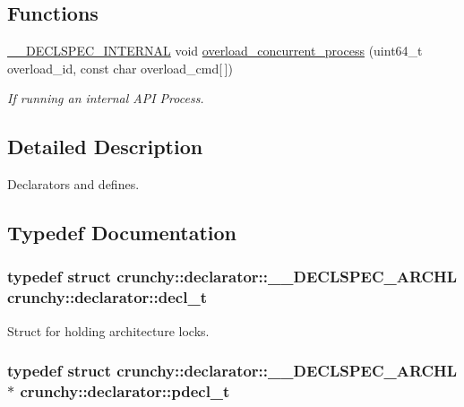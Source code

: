 \subsection*{Functions}
\begin{DoxyCompactItemize}
\item 
\hyperlink{_c_r_h___declspec_8h_add2c9e5146b4eb6fdda70423049d29a4}{\+\_\+\+\_\+\+D\+E\+C\+L\+S\+P\+E\+C\+\_\+\+I\+N\+T\+E\+R\+N\+A\+L} void \hyperlink{namespacecrunchy_1_1declarator_a99b90638be455e5c536be8e8fd1fc535}{overload\+\_\+concurrent\+\_\+process} (uint64\+\_\+t overload\+\_\+id, const char overload\+\_\+cmd\mbox{[}$\,$\mbox{]})
\begin{DoxyCompactList}\small\item\em If running an internal A\+P\+I Process. \end{DoxyCompactList}\end{DoxyCompactItemize}


\subsection{Detailed Description}
Declarators and defines. 

\subsection{Typedef Documentation}
\hypertarget{namespacecrunchy_1_1declarator_a0f9bbabe1552349f0ee0ae228ed30bb2}{}
\subsubsection[{decl\+\_\+t}]{\setlength{\rightskip}{0pt plus 5cm}typedef struct {\bf crunchy\+::declarator\+::\+\_\+\+\_\+\+D\+E\+C\+L\+S\+P\+E\+C\+\_\+\+A\+R\+C\+H\+L}  {\bf crunchy\+::declarator\+::decl\+\_\+t}}\label{namespacecrunchy_1_1declarator_a0f9bbabe1552349f0ee0ae228ed30bb2}


Struct for holding architecture locks. 

\hypertarget{namespacecrunchy_1_1declarator_a518adbd030268ca7f676cfe5c5ee7624}{}
\subsubsection[{pdecl\+\_\+t}]{\setlength{\rightskip}{0pt plus 5cm}typedef struct {\bf crunchy\+::declarator\+::\+\_\+\+\_\+\+D\+E\+C\+L\+S\+P\+E\+C\+\_\+\+A\+R\+C\+H\+L} $\ast$ {\bf crunchy\+::declarator\+::pdecl\+\_\+t}}\label{namespacecrunchy_1_1declarator_a518adbd030268ca7f676cfe5c5ee7624}


